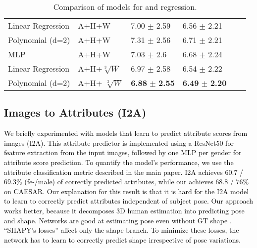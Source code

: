 \documentclass[10pt,twocolumn,letterpaper]{article}
\newcommand{\modelCOLOR}{black}
\newcommand{\modelname}{{\color{\modelCOLOR}SHAPY}\xspace}
\newcommand{\AtoS}{\text{\mbox{A2S}}\xspace}
\newcommand{\ItoA}{\mbox{I2A}\xspace}
\newcommand{\StoA}{\text{\mbox{S2A}}\xspace}
\newcommand{\AHWtoS}{\text{\mbox{AHW2S}}\xspace}
\newcommand{\threeD}{3D\xspace}
\newcommand{\caesar}{\mbox{CAESAR}\xspace}
\newcommand{\resnet}{\mbox{ResNet50}\xspace}
\newcommand{\cameraready}[1]{\textcolor{Fuchsia}{{#1}}\xspace}
\renewcommand{\cameraready}[1]{\textcolor{black}{{#1}}\xspace}
\begin{document}
\begin{appendices}
\begin{table}
\begin{tabular}{llllll}
    \midrule
    Linear Regression & A+H+W                             & 7.00             $\pm$ 2.59            & 6.56             $\pm$ 2.21   \\
    Polynomial (d=2)  & A+H+W                             & 7.31             $\pm$ 2.56            & 6.71             $\pm$ 2.21            \\
    MLP             & A+H+W                             & 7.03             $\pm$ 2.6             & 6.68             $\pm$ 2.24            \\
    Linear Regression & A+H+$\sqrt[3]{W}$                         & 6.97             $\pm$ 2.58            & 6.54             $\pm$ 2.22            \\
    Polynomial (d=2)  & A+H+ $\sqrt[3]{W}$                         & \textbf{6.88}    $\pm$ \textbf{2.55}   & \textbf{6.49}    $\pm$ \textbf{2.20}   \\
    \bottomrule
\end{tabular}
\caption{Comparison of models for \AtoS and  \AHWtoS regression.}
\label{tab:AtoS_Comparison_Models}
\end{table}
  \subsection{Images to Attributes (\ItoA)}
\label{supmat:subsec:attrs_from_images}

\cameraready{We briefly experimented with models that learn to predict
    attribute scores from images (\ItoA). This attribute predictor
    is implemented using a \resnet for feature extraction from the input
    images, followed by one MLP per gender for attribute score prediction.
    To quantify the model's performance, we use the attribute classification
    metric described in the main paper. \ItoA
    achieves $60.7$ / $69.3 \%$ (fe-/male) of correctly predicted attributes,
    while our \StoA achieves $68.8$ / $76 \%$  on \caesar.
    Our explanation for this result is that it is hard for the \ItoA
    model to learn to correctly
    predict attributes independent of subject pose.
    Our approach works better, because it decomposes \threeD human estimation into predicting pose and
    shape.
    Networks are good at estimating pose even without
    GT shape \cite{li2021hybrik}.
    ``\modelname’s losses''
    affect only the shape branch. To minimize these losses,
    the network has to learn to correctly predict shape irrespective
    of pose variations.
} 

\end{appendices}
\end{document}
